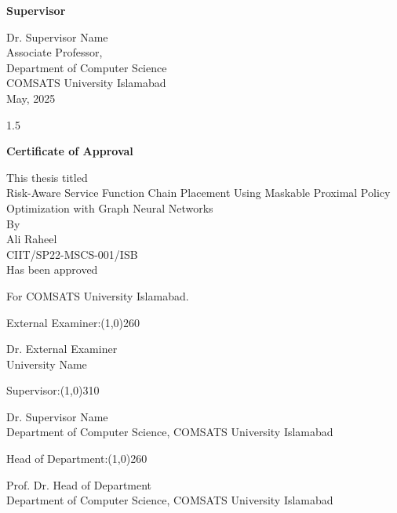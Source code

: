 \documentclass[A4paper,12pt]{report}
\theoremstyle{plain}
\theoremstyle{definition}
\theoremstyle{remark}
\numberwithin{equation}{section}
\begin{document}
\noindent\large{\textbf{Supervisor}}
\begin{flushleft}
\vspace{0.3in}
\large{Dr. Supervisor Name\\
\vspace{0.1in}
Associate Professor,\\
Department of Computer Science\\
\vspace{0.1in}
COMSATS University Islamabad\\

\vspace{0.2in}
May, 2025 }
\end{flushleft}
\newpage
\begin{spacing}{1.5}
\begin{center}
\LARGE{\textbf{{Certificate of Approval}}}\\
\end{center}

\begin{center}
\normalsize {This thesis titled}\\
\LARGE{Risk-Aware Service Function Chain Placement Using Maskable Proximal Policy Optimization with Graph Neural Networks}\\
\normalsize {By\\
Ali Raheel\\

CIIT/SP22-MSCS-001/ISB\\

Has been approved}\\

\end{center}

\begin{center}
\normalsize {For COMSATS University Islamabad.}\\
\end{center}

\vspace{0.1in}
\noindent \normalsize {External Examiner:}\line(1,0){260}
\begin{center}
\normalsize {Dr. External Examiner}\\
University Name\\
\end{center}
\vspace{0.1in}
\normalsize {Supervisor:}\line(1,0){310}
\begin{center}
\normalsize {Dr. Supervisor Name\\
Department of Computer Science, COMSATS University Islamabad}
\end{center}
\vspace{0.1in}
\normalsize {Head of Department:}\line(1,0){260}
\begin{center}
\normalsize {Prof. Dr. Head of Department\\
Department of Computer Science, COMSATS University Islamabad}
\end{center}


\end{spacing}
\end{document}
